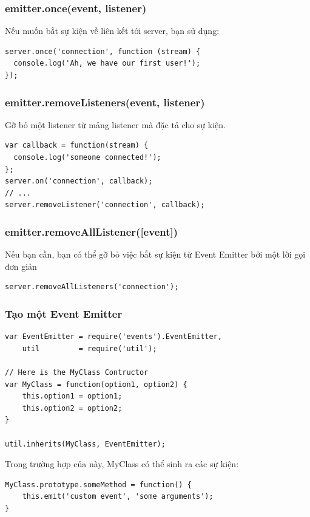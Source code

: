 			
		\subsubsection{emitter.once(event, listener)}
Nếu muốn bắt sự kiện về  liên kết tới server, bạn sử dụng: 
			\begin{verbatim}
server.once('connection', function (stream) {
  console.log('Ah, we have our first user!');
});
			\end{verbatim}
		
		\subsubsection{emitter.removeListeners(event, listener)}
		Gỡ bỏ một listener từ mảng listener mà đặc tả cho sự kiện.
		    \begin{verbatim}
var callback = function(stream) {
  console.log('someone connected!');
};
server.on('connection', callback);
// ...
server.removeListener('connection', callback);		    
		    \end{verbatim}
			
	    \subsubsection{emitter.removeAllListener([event])}
		Nếu bạn cần, bạn có thể gỡ bỏ việc bắt sự kiện từ Event Emitter bởi một lời gọi đơn giản\\
			\begin{verbatim}
server.removeAllListeners('connection');
			\end{verbatim}

\subsubsection{Tạo một Event Emitter}
			\begin{verbatim}
var EventEmitter = require('events').EventEmitter,
	util 		 = require('util');

// Here is the MyClass Contructor
var MyClass = function(option1, option2) {
	this.option1 = option1;
	this.option2 = option2;
}

util.inherits(MyClass, EventEmitter);
			\end{verbatim}
			
	Trong trường hợp của này, MyClass có thể sinh ra các sự kiện:\\
	\begin{verbatim}
MyClass.prototype.someMethod = function() {
	this.emit('custom event', 'some arguments');
}
	\end{verbatim}
	

